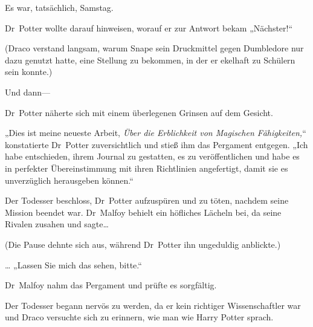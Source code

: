 Es war, tatsächlich, Samstag.

Dr~Potter wollte darauf hinweisen, worauf er zur Antwort bekam „Nächster!“

(Draco verstand langsam, warum Snape sein Druckmittel gegen Dumbledore nur dazu genutzt hatte, eine Stellung zu bekommen, in der er ekelhaft zu Schülern sein konnte.)

Und dann—

Dr~Potter näherte sich mit einem überlegenen Grinsen auf dem Gesicht.

„Dies ist meine neueste Arbeit, \emph{Über die Erblichkeit von Magischen Fähigkeiten,}“ konstatierte Dr~Potter zuversichtlich und stieß ihm das Pergament entgegen. „Ich habe entschieden, ihrem Journal zu gestatten, es zu veröffentlichen und habe es in perfekter Übereinstimmung mit ihren Richtlinien angefertigt, damit sie es unverzüglich herausgeben können.“

Der Todesser beschloss, Dr~Potter aufzuspüren und zu töten, nachdem seine Mission beendet war. Dr~Malfoy behielt ein höfliches Lächeln bei, da seine Rivalen zusahen und sagte…

(Die Pause dehnte sich aus, während Dr~Potter ihn ungeduldig anblickte.)

… „Lassen Sie mich das sehen, bitte.“

Dr~Malfoy nahm das Pergament und prüfte es sorgfältig.

Der Todesser begann nervös zu werden, da er kein richtiger Wissenschaftler war und Draco versuchte sich zu erinnern, wie man wie Harry Potter sprach.

